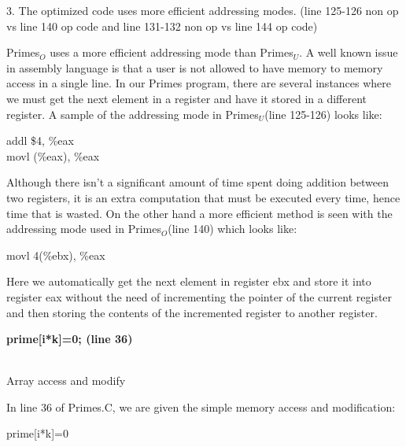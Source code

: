 \documentclass[11pt]{article}
\begin{document}
3. The optimized code uses more efficient addressing modes. (line 125-126 non op vs line 140 op code and line 131-132 non op vs line 144 op code)

Primes$_{O}$ uses a more efficient addressing mode than Primes$_{U}$. A well known issue in assembly language is that a user is not allowed to have memory to memory access in a single line. In our Primes program, there are several instances where we must get the next element in a register and have it stored in a different register. A sample of the addressing mode in Primes$_{U}$(line 125-126) looks like:


\hspace*{2.2in} addl \$4, \%eax \\

\hspace*{2.2in} movl (\%eax), \%eax 


Although there isn't a significant amount of time spent doing addition between two registers, it is an extra computation that must be executed every time, hence time that is wasted. On the other hand a more efficient method is seen with the addressing mode used in Primes$_{O}$(line 140) which looks like: 


\hspace*{2.2in} movl 4(\%ebx), \%eax


Here we automatically get the next element in register ebx and store it into register eax without the need of incrementing the pointer of the current register and then storing the contents of the incremented register to another register.



\newenvironment{myindentpar}[1]

{\begin{list}{} 

{\setlength{\leftmargin}{#1}}\item[]}

{\end{list}}


{\bf prime[i*k]=0; (line 36)

\\Array access and modify}



In line 36 of Primes.C, we are given the simple memory access and modification:


\hspace*{2.2 in} prime[i*k]=0
\end{document}
